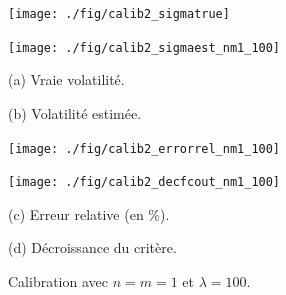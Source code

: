 \begin{figure}[!htbp]

\begin{center}
\begin{minipage}{5.8cm}
\centerline{\texttt{[image: ./fig/calib2\_sigmatrue]}
} 
\end{minipage}
\hspace*{0.1cm}
\begin{minipage}{5.8cm}
\centerline{\texttt{[image: ./fig/calib2\_sigmaest\_nm1\_100]}
}
\end{minipage}
\end{center}

\begin{center}
\begin{minipage}{5.8cm}
(a) Vraie volatilit\'e.
\end{minipage}
\hspace*{0.1cm}
\begin{minipage}{5.8cm}
(b) Volatilit\'e estim\'ee.
\end{minipage}
\end{center}

\medskip

\begin{center}
\begin{minipage}{5.8cm}
\centerline{\texttt{[image: ./fig/calib2\_errorrel\_nm1\_100]}
}
\end{minipage}
\hspace*{0.1cm}
\begin{minipage}{5.8cm}
\centerline{\texttt{[image: ./fig/calib2\_decfcout\_nm1\_100]}
}
\end{minipage}
\end{center}

\begin{center}
\begin{minipage}{5.8cm}
(c) Erreur relative (en \%).
\end{minipage}
\hspace*{0.1cm}
\begin{minipage}{5.8cm}
(d) D\'ecroissance du crit\`ere.
\end{minipage}
\end{center}

\caption{Calibration avec $n = m = 1$ et $\lambda = 100$.}
\label{FIG:CALIB2_NM1_100}
\end{figure}

\pagebreak

